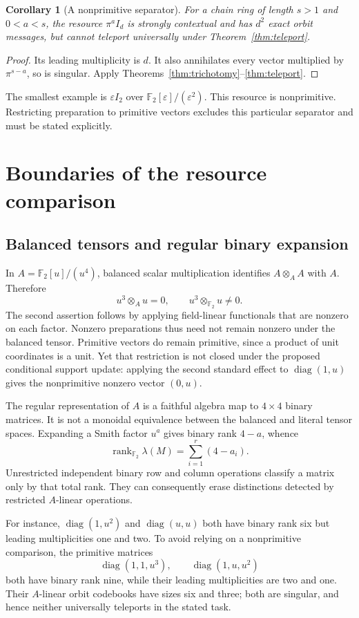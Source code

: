 \documentclass[11pt]{article}
\newtheorem{corollary}[theorem]{Corollary}
\theoremstyle{definition}\newtheorem{definition}[theorem]{Definition}
\theoremstyle{remark}\newtheorem{remark}[theorem]{Remark}
\newcommand{\F}{\mathbb F}
\newcommand{\A}{\F_2[u]/(u^4)}
\DeclareMathOperator{\rank}{rank}
\DeclareMathOperator{\diag}{diag}
\begin{document}
\begin{corollary}[A nonprimitive separator]\label{cor:separator}
For a chain ring of length $s>1$ and $0<a<s$, the resource $\pi^a I_d$ is strongly contextual and has $d^2$ exact orbit messages, but cannot teleport universally under Theorem~\ref{thm:teleport}.
\end{corollary}
\begin{proof}
Its leading multiplicity is $d$. It also annihilates every vector multiplied by $\pi^{s-a}$, so is singular. Apply Theorems~\ref{thm:trichotomy}--\ref{thm:teleport}.
\end{proof}
The smallest example is $\varepsilon I_2$ over $\F_2[\varepsilon]/(\varepsilon^2)$. This resource is nonprimitive. Restricting preparation to primitive vectors excludes this particular separator and must be stated explicitly.

\section{Boundaries of the resource comparison}\label{sec:boundaries}
\subsection{Balanced tensors and regular binary expansion}
In $A=\A$, balanced scalar multiplication identifies $A\otimes_A A$ with $A$. Therefore
\[
 u^3\otimes_Au=0,\qquad u^3\otimes_{\F_2}u\ne0.
\]
The second assertion follows by applying field-linear functionals that are nonzero on each factor. Nonzero preparations thus need not remain nonzero under the balanced tensor. Primitive vectors do remain primitive, since a product of unit coordinates is a unit. Yet that restriction is not closed under the proposed conditional support update: applying the second standard effect to $\diag(1,u)$ gives the nonprimitive nonzero vector $(0,u)$.

The regular representation of $A$ is a faithful algebra map to $4\times4$ binary matrices. It is not a monoidal equivalence between the balanced and literal tensor spaces. Expanding a Smith factor $u^a$ gives binary rank $4-a$, whence
\[
 \rank_{\F_2}\lambda(M)=\sum_{i=1}^r(4-a_i).
\]
Unrestricted independent binary row and column operations classify a matrix only by that total rank. They can consequently erase distinctions detected by restricted $A$-linear operations.

For instance, $\diag(1,u^2)$ and $\diag(u,u)$ both have binary rank six but leading multiplicities one and two. To avoid relying on a nonprimitive comparison, the primitive matrices
\[
 \diag(1,1,u^3),\qquad \diag(1,u,u^2)
\]
both have binary rank nine, while their leading multiplicities are two and one. Their $A$-linear orbit codebooks have sizes six and three; both are singular, and hence neither universally teleports in the stated task.
\end{document}
